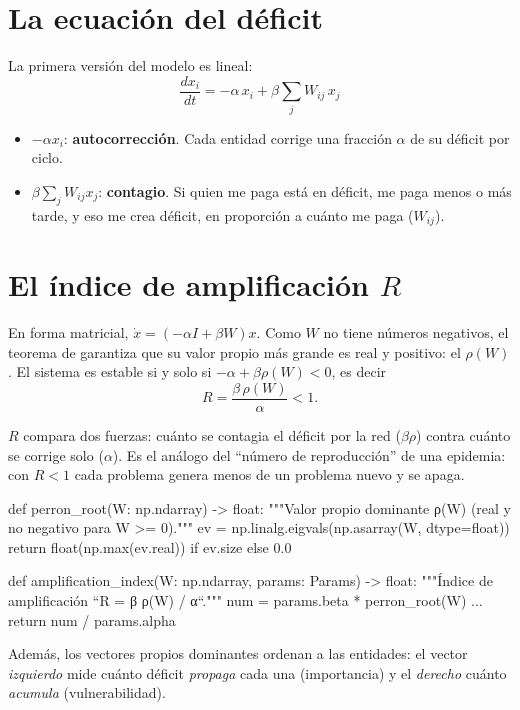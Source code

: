 \section{La ecuación del déficit}
La primera versión del modelo es lineal:
\[
\boxed{\;\frac{dx_i}{dt} = -\alpha\,x_i + \beta\sum_j W_{ij}\,x_j\;}
\]
\begin{itemize}
\item $-\alpha x_i$: \textbf{autocorrección}. Cada entidad corrige una fracción
$\alpha$ de su déficit por ciclo.
\item $\beta\sum_j W_{ij}x_j$: \textbf{contagio}. Si quien me paga está en déficit, me
paga menos o más tarde, y eso me crea déficit, en proporción a cuánto me paga
($W_{ij}$).
\end{itemize}

\section{El índice de amplificación $R$}
En forma matricial, $\dot x = (-\alpha I + \beta W)x$. Como $W$ no tiene números
negativos, el teorema de  garantiza que su valor propio más
grande es real y positivo: el  $\rho(W)$. El sistema es estable
si y solo si $-\alpha + \beta\rho(W) < 0$, es decir
\[
\boxed{\;R = \frac{\beta\,\rho(W)}{\alpha} < 1.\;}
\]
\begin{idea}
$R$ compara dos fuerzas: cuánto se contagia el déficit por la red ($\beta\rho$) contra
cuánto se corrige solo ($\alpha$). Es el análogo del ``número de reproducción'' de una
epidemia: con $R<1$ cada problema genera menos de un problema nuevo y se apaga.
\end{idea}

\begin{codigo}[label=src/pulso/spectral.py]
def perron_root(W: np.ndarray) -> float:
    """Valor propio dominante ρ(W) (real y no negativo para W >= 0)."""
    ev = np.linalg.eigvals(np.asarray(W, dtype=float))
    return float(np.max(ev.real)) if ev.size else 0.0

def amplification_index(W: np.ndarray, params: Params) -> float:
    """Índice de amplificación ``R = β ρ(W) / α``."""
    num = params.beta * perron_root(W)
    ...
    return num / params.alpha
\end{codigo}

Además, los vectores propios dominantes ordenan a las entidades: el vector
\emph{izquierdo} mide cuánto déficit \emph{propaga} cada una (importancia) y el
\emph{derecho} cuánto \emph{acumula} (vulnerabilidad).

